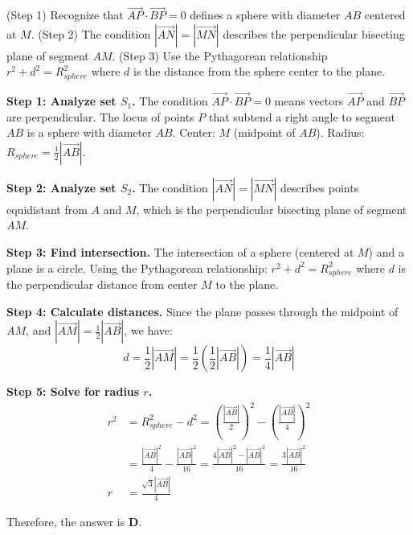 \begin{hint}
(Step 1) Recognize that $\overrightarrow{AP} \cdot \overrightarrow{BP} = 0$ defines a sphere with diameter $AB$ centered at $M$. (Step 2) The condition $|\overrightarrow{AN}| = |\overrightarrow{MN}|$ describes the perpendicular bisecting plane of segment $AM$. (Step 3) Use the Pythagorean relationship $r^2 + d^2 = R_{sphere}^2$ where $d$ is the distance from the sphere center to the plane.
\end{hint}

\begin{solution}[Sketch]
\textbf{Step 1: Analyze set $S_1$.} The condition $\overrightarrow{AP} \cdot \overrightarrow{BP} = 0$ means vectors $\overrightarrow{AP}$ and $\overrightarrow{BP}$ are perpendicular. The locus of points $P$ that subtend a right angle to segment $AB$ is a sphere with diameter $AB$. Center: $M$ (midpoint of $AB$). Radius: $R_{sphere} = \frac{1}{2}|\overrightarrow{AB}|$.

\textbf{Step 2: Analyze set $S_2$.} The condition $|\overrightarrow{AN}| = |\overrightarrow{MN}|$ describes points equidistant from $A$ and $M$, which is the perpendicular bisecting plane of segment $AM$.

\textbf{Step 3: Find intersection.} The intersection of a sphere (centered at $M$) and a plane is a circle. Using the Pythagorean relationship: $r^2 + d^2 = R_{sphere}^2$ where $d$ is the perpendicular distance from center $M$ to the plane.

\textbf{Step 4: Calculate distances.} Since the plane passes through the midpoint of $AM$, and $|\overrightarrow{AM}| = \frac{1}{2}|\overrightarrow{AB}|$, we have:
\[ d = \frac{1}{2}|\overrightarrow{AM}| = \frac{1}{2} \left( \frac{1}{2}|\overrightarrow{AB}| \right) = \frac{1}{4}|\overrightarrow{AB}| \]

\textbf{Step 5: Solve for radius $r$.}
\begin{align*}
    r^2 &= R_{sphere}^2 - d^2 = \left( \frac{|\overrightarrow{AB}|}{2} \right)^2 - \left( \frac{|\overrightarrow{AB}|}{4} \right)^2 \\
    &= \frac{|\overrightarrow{AB}|^2}{4} - \frac{|\overrightarrow{AB}|^2}{16} = \frac{4|\overrightarrow{AB}|^2 - |\overrightarrow{AB}|^2}{16} = \frac{3|\overrightarrow{AB}|^2}{16} \\
    r &= \frac{\sqrt{3}|\overrightarrow{AB}|}{4}
\end{align*}

Therefore, the answer is \textbf{D}.
\end{solution}

